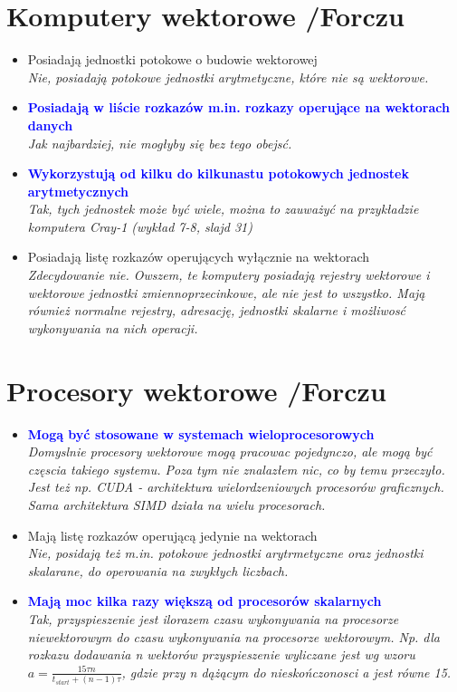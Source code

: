 \documentclass[a4paper,twoside]{article}
\begin{document}
\section{Komputery wektorowe  {\small /Forczu}}
	\begin{itemize}
    \item Posiadają jednostki potokowe o budowie wektorowej\\
    {\small \emph{Nie, posiadają potokowe jednostki arytmetyczne, które nie są wektorowe.}}
    \item \textcolor{Blue}{\textbf{Posiadają w liście rozkazów m.in. rozkazy operujące na wektorach danych}}\\
    {\small \emph{Jak najbardziej, nie mogłyby się bez tego obejsć.}}
    \item \textcolor{Blue}{\textbf{Wykorzystują od kilku do kilkunastu potokowych jednostek arytmetycznych}}\\
    {\small \emph{Tak, tych jednostek może być wiele, można to zauważyć na przykładzie komputera Cray-1 (wykład 7-8, slajd 31)}}
    \item Posiadają listę rozkazów operujących wyłącznie na wektorach\\
    {\small \emph{Zdecydowanie nie. Owszem, te komputery posiadają rejestry wektorowe i wektorowe jednostki zmiennoprzecinkowe, ale nie jest to wszystko. Mają również normalne rejestry, adresację, jednostki skalarne i możliwosć wykonywania na nich operacji.}}
    \end{itemize}

\section{Procesory wektorowe {\small /Forczu}}
	\begin{itemize}
    \item \textcolor{Blue}{\textbf{Mogą być stosowane w systemach wieloprocesorowych}}\\
    {\small \emph{Domyslnie procesory wektorowe mogą pracowac pojedynczo, ale mogą być częscia takiego systemu. Poza tym nie znalazłem nic, co by temu przeczyło. Jest też np. CUDA - architektura wielordzeniowych procesorów graficznych. Sama architektura SIMD działa na wielu procesorach.}}
    \item Mają listę rozkazów operującą jedynie na wektorach\\
    {\small \emph{Nie, posidają też m.in. potokowe jednostki arytrmetyczne oraz jednostki skalarane, do operowania na zwykłych liczbach.}}
    \item \textcolor{Blue}{\textbf{Mają moc kilka razy większą od procesorów skalarnych}}\\
    {\small \emph{Tak, przyspieszenie jest ilorazem czasu wykonywania na procesorze niewektorowym do czasu wykonywania na procesorze wektorowym. Np. dla rozkazu dodawania \emph{n} wektorów przyspieszenie wyliczane jest wg wzoru $ a=\frac{15\tau n}{t_{start}+(n-1)\tau} $, gdzie przy \emph{n} dążącym do nieskończonosci \emph{a} jest równe 15.}}
    \end{itemize}
\end{document}
